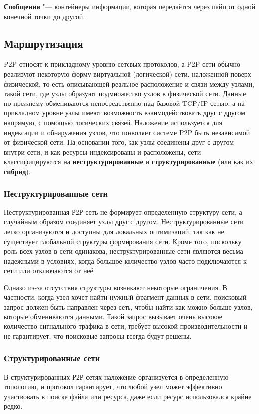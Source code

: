 \documentclass[bachelor, och, coursework]{SCWorks}
\begin{document}
\textbf{Сообщения} "--- контейнеры информации, которая передаётся через пайп от одной конечной точки до другой.

\subsection{Маршрутизация}
P2P относят к прикладному уровню сетевых протоколов, а P2P-сети обычно реализуют некоторую форму виртуальной (логической) сети, наложенной поверх физической, то есть описывающей реальное расположение
и связи между узлами, такой сети, где узлы образуют подмножество узлов в физической сети. 
Данные по-прежнему обмениваются непосредственно над базовой TCP/IP сетью, 
а на прикладном уровне узлы имеют возможность взаимодействовать друг с другом напрямую, 
с помощью логических связей. Наложение используется для индексации и обнаружения узлов, 
что позволяет системе P2P быть независимой от физической сети. На основании того, как узлы соединены 
друг с другом внутри сети, и как ресурсы индексированы и расположены, сети классифицируются на 
\textbf{неструктурированные} и \textbf{структурированные} (или как их \textbf{гибрид}).

\subsubsection{Неструктурированные сети}
Неструктурированная Р2Р сеть не формирует определенную структуру сети, а случайным образом соединяет узлы друг с другом. 
Неструктурированные сети легко организуются и доступны для локальных оптимизаций, так как не существует глобальной структуры формирования сети.
Кроме того, поскольку роль всех узлов в сети одинакова, неструктурированные сети являются весьма надежными в условиях, 
когда большое количество узлов часто подключаются к сети или отключаются от неё.

Однако из-за отсутствия структуры возникают некоторые ограничения. 
В частности, когда узел хочет найти нужный фрагмент данных в сети, поисковый запрос должен быть направлен через сеть, 
чтобы найти как можно больше узлов, которые обмениваются данными. Такой запрос вызывает очень высокое количество сигнального трафика в сети, 
требует высокой производительности и не гарантирует, что поисковые запросы всегда будут решены.

\subsubsection{Структурированные сети}
В структурированных Р2Р-сетях наложение организуется в определенную топологию, и протокол гарантирует, 
что любой узел может эффективно участвовать в поиске файла или ресурса, даже если ресурс использовался крайне редко.
\end{document}
